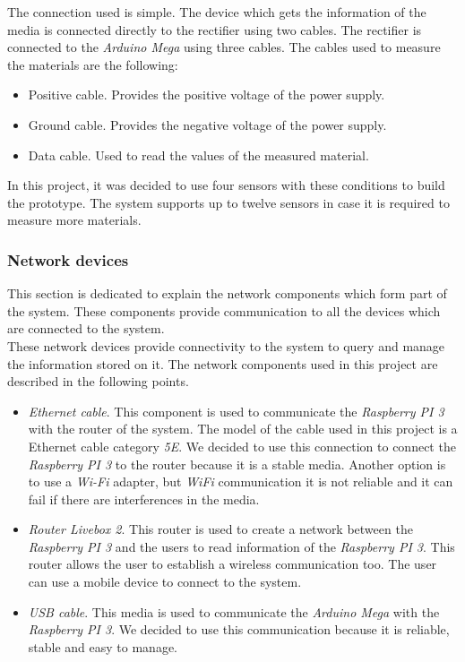 The connection used is simple. The device which gets the information of the media is connected directly to the rectifier using two cables. The rectifier is connected to the \textit{Arduino Mega} using three cables. The cables used to measure the materials are the following:

\begin{itemize}

\item Positive cable. Provides the positive voltage of the power supply.
\item Ground cable. Provides the negative voltage of the power supply.
\item Data cable. Used to read the values of the measured material.

\end{itemize}

In this project, it was decided to use four sensors with these conditions to build the prototype. The system supports up to twelve sensors in case it is required to measure more materials.

\subsubsection{Network devices}

This section is dedicated to explain the network components which form part of the system. These components provide communication to all the devices which are connected to the system.\\ 

These network devices provide connectivity to the system to query and manage the information stored on it. The network components used in this project are described in the following points.\\

\begin{itemize}

\item \textit{Ethernet cable}. This component is used to communicate the \textit{Raspberry PI 3} with the router of the system. The model of the cable used in this project is a Ethernet cable category \textit{5E}. We decided to use this connection to connect the \textit{Raspberry PI 3} to the router because it is a stable media. Another option is to use a \textit{Wi-Fi} adapter, but \textit{WiFi} communication it is not reliable and it can fail if there are interferences in the media.

\item \textit{Router Livebox 2}. This router is used to create a network between the \textit{Raspberry PI 3} and the users to read information of the \textit{Raspberry PI 3}. This router allows the user to establish a wireless communication too. The user can use a mobile device to connect to the system.

\item \textit{USB cable}. This media is used to communicate the \textit{Arduino Mega} with the \textit{Raspberry PI 3}. We decided to use this communication because it is reliable, stable and easy to manage.

\end{itemize}

